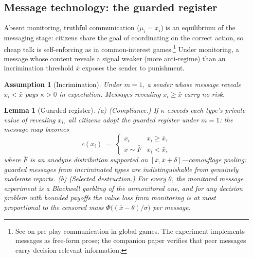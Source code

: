 \documentclass[11pt]{article}
\newtheorem{lemma}{Lemma}
\newtheorem{assumption}{Assumption}
\theoremstyle{remark}
\begin{document}
\subsection{Message technology: the guarded register}

Absent monitoring, truthful communication ($\mu_i = x_i$) is an equilibrium of the messaging stage: citizens share the goal of coordinating on the correct action, so cheap talk is self-enforcing as in common-interest games.\footnote{See \citet{avoyan2020} on pre-play communication in global games. The experiment implements messages as free-form prose; the companion paper verifies that peer messages carry decision-relevant information.} Under monitoring, a message whose content reveals a signal weaker (more anti-regime) than an incrimination threshold $\bar{x}$ exposes the sender to punishment.

\begin{assumption}[Incrimination]\label{ass:incrim}
Under $m=1$, a sender whose message reveals $x_i < \bar{x}$ pays $\kappa > 0$ in expectation. Messages revealing $x_i \ge \bar{x}$ carry no risk.
\end{assumption}

\begin{lemma}[Guarded register]\label{lem:register}
\emph{(a) (Compliance.)} If $\kappa$ exceeds each type's private value of revealing $x_i$, all citizens adopt the guarded register under $m=1$: the message map becomes
\[
c(x_i) \;=\; \begin{cases} x_i & x_i \ge \bar{x}, \\ \tilde{x} \sim \bar{F} & x_i < \bar{x}, \end{cases}
\]
where $\bar{F}$ is an anodyne distribution supported on $[\bar x, \bar x + \delta]$---camouflage pooling: guarded messages from incriminated types are indistinguishable from genuinely moderate reports.
\emph{(b) (Selected destruction.)} For every $\theta$, the monitored message experiment is a Blackwell garbling of the unmonitored one, and for any decision problem with bounded payoffs the value loss from monitoring is at most proportional to the censored mass $\Phi\!\big((\bar{x}-\theta)/\sigma\big)$ per message.
\end{lemma}
\end{document}
